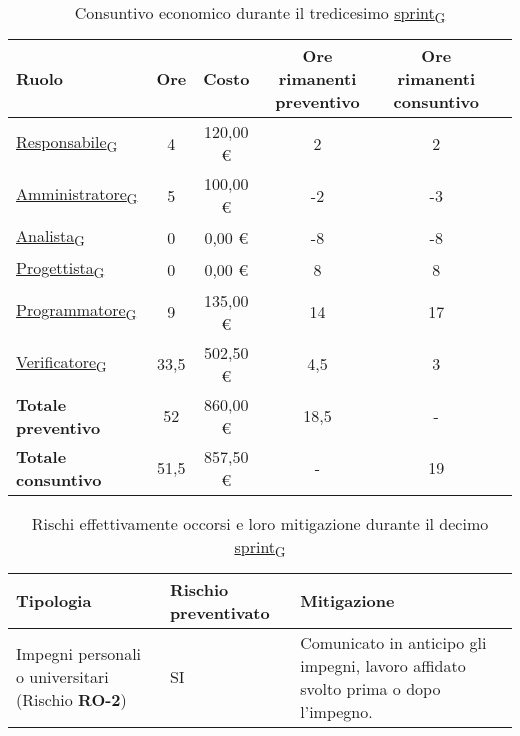 \newpage
{}
\begin{table}[!h]
    \centering
    \begin{tabular}{ | l | c | c | c | c | c | }
        \hline
        \textbf{Ruolo} & \textbf{Ore} & \textbf{Costo} & \textbf{Ore rimanenti preventivo} & \textbf{Ore rimanenti consuntivo} \\
        \hline
        \href{https://7last.github.io/docs/rtb/documentazione-interna/glossario\#responsabile}{Responsabile\textsubscript{G}}     &  4   &  120,00 € &   2   &   2   \\
        \href{https://7last.github.io/docs/rtb/documentazione-interna/glossario\#amministratore}{Amministratore\textsubscript{G}} &  5   &  100,00 € &  -2   &  -3   \\
        \href{https://7last.github.io/docs/rtb/documentazione-interna/glossario\#analista}{Analista\textsubscript{G}}             &  0   &    0,00 € &  -8   &  -8   \\
        \href{https://7last.github.io/docs/rtb/documentazione-interna/glossario\#progettista}{Progettista\textsubscript{G}}       &  0   &    0,00 € &   8   &   8   \\
        \href{https://7last.github.io/docs/rtb/documentazione-interna/glossario\#programmatore}{Programmatore\textsubscript{G}}   &  9   &  135,00 € &  14   &  17   \\
        \href{https://7last.github.io/docs/rtb/documentazione-interna/glossario\#verificatore}{Verificatore\textsubscript{G}}     & 33,5 &  502,50 € &   4,5 &   3   \\
        \hline
        \textbf{Totale preventivo} & 52   &  860,00 € &  18,5 &   -   \\
        \hline
        \textbf{Totale consuntivo} & 51,5 &  857,50 € &   -   &  19   \\
        \hline
    \end{tabular}
    \caption{Consuntivo economico durante il tredicesimo \href{https://7last.github.io/docs/rtb/documentazione-interna/glossario\#sprint}{sprint\textsubscript{G}}}
\end{table}

\begin{table}[!h]
    \centering
    \begin{tabular}{ | p{6cm} | p{2.5cm} | p{7.5cm} | }
        \hline
        \textbf{Tipologia} & \textbf{Rischio preventivato} & \textbf{Mitigazione}  \\
        \hline
        Impegni personali o universitari (Rischio \textbf{RO-2})& SI & Comunicato in anticipo gli impegni, lavoro affidato svolto prima o dopo l'impegno.\\
        \hline
    \end{tabular}
    \caption{Rischi effettivamente occorsi e loro mitigazione durante il decimo \href{https://7last.github.io/docs/rtb/documentazione-interna/glossario\#sprint}{sprint\textsubscript{G}}}
\end{table}

